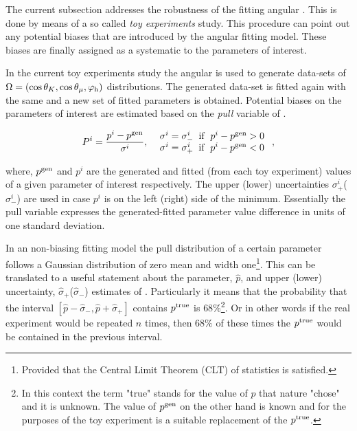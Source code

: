 The current subsection addresses the robustness of the fitting angular \pdf.
This is done by means of a so called {\it toy experiments} study. This procedure
can point out any potential biases that are introduced by the angular fitting model.
These biases are finally assigned as a systematic to the parameters of interest.

In the current toy experiments study the angular \pdf is used to generate data-sets of $\Omega = (\cos\theta_{K},\cos\theta_{\mu},\varphi_{\text h})$
distributions. The generated data-set is fitted again with the same \pdf and a new set of fitted parameters is obtained. Potential
biases on the parameters of interest are estimated based on the {\it pull} variable of .

\begin{equation}
P^i = \frac{p^i - p^{\rm gen}}{ \sigma^i },\;\;\left.
  \begin{array}{ll}
    \sigma^i = \sigma^i_- \;\;{\rm if}\;\; p^i - p^{\rm gen} > 0   \\
    \sigma^i = \sigma^i_+ \;\;{\rm if}\;\; p^i - p^{\rm gen} < 0
  \end{array} \right. ,
\label{pull_def}
\end{equation}

\noindent where, $p^{\rm gen}$ and $p^i$ are the generated and fitted (from each toy experiment) values of a given parameter of interest
respectively. The upper (lower) uncertainties $\sigma^i_+$($\sigma^i_-$) are used in case $p^i$ is on the left (right) side of the minimum.
Essentially the pull variable expresses the generated-fitted parameter value difference in units of one standard deviation.

In an non-biasing fitting model the pull distribution of a certain parameter follows a Gaussian distribution of zero mean and width
one\footnote{Provided that the Central Limit Theorem (CLT) of statistics is satisfied.}.
This can be translated to a useful statement about the parameter, $\hat{p}$, and upper (lower) uncertainty, $\hat{\sigma}_+$($\hat{\sigma}_-$)
estimates of . Particularly it means that the probability that the interval
$[\hat{p}-\hat{\sigma}_-,\hat{p}+\hat{\sigma}_+]$ contains $p^{\rm true}$ is $68\%$\footnote{In this context the term "true" stands for the
value of $p$ that nature "chose" and it is unknown. The value of $p^{\rm gen}$ on the other hand is known and for the purposes of
the toy experiment is a suitable replacement of the $p^{\rm true}$.}. Or in other words if the real experiment would be repeated
$n$ times, then $68\%$ of these times the $p^{\rm true}$ would be contained in the previous interval.

